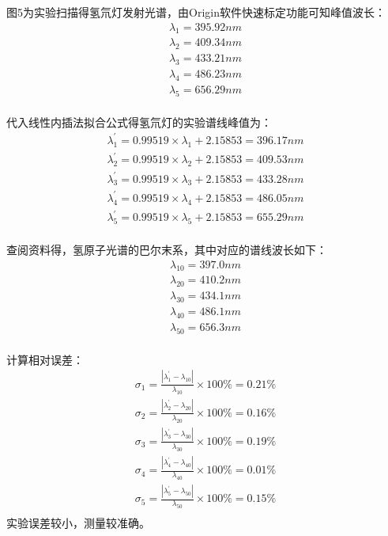 \documentclass[12pt,a4paper,UTF8]{ctexart}
\begin{document}
图5为实验扫描得氢氘灯发射光谱，由Origin软件快速标定功能可知峰值波长：
\begin{gather*}
	\lambda_1=395.92nm\\
	\lambda_2=409.34nm\\
	\lambda_3=433.21nm\\
	\lambda_4=486.23nm\\
	\lambda_5=656.29nm\\
\end{gather*}

代入线性内插法拟合公式得氢氘灯的实验谱线峰值为：
\begin{gather*}
	\lambda^{'}_1=0.99519\times\lambda_1+2.15853=396.17nm\\
	\lambda^{'}_2=0.99519\times\lambda_2+2.15853=409.53nm\\
	\lambda^{'}_3=0.99519\times\lambda_3+2.15853=433.28nm\\
	\lambda^{'}_4=0.99519\times\lambda_4+2.15853=486.05nm\\
	\lambda^{'}_5=0.99519\times\lambda_5+2.15853=655.29nm\\
\end{gather*}

查阅资料得，氢原子光谱的巴尔末系，其中对应的谱线波长如下：
\begin{gather*}
	\lambda_{10}=397.0nm\\
	\lambda_{20}=410.2nm\\
	\lambda_{30}=434.1nm\\
	\lambda_{40}=486.1nm\\
	\lambda_{50}=656.3nm\\
\end{gather*}

计算相对误差：
\begin{gather*}
	\sigma _1=\frac{|\lambda^{'}_1-\lambda_{10}|}{\lambda_{10}}\times100\%=0.21\%\\
	\sigma _2=\frac{|\lambda^{'}_2-\lambda_{20}|}{\lambda_{20}}\times100\%=0.16\%\\
	\sigma _3=\frac{|\lambda^{'}_3-\lambda_{30}|}{\lambda_{30}}\times100\%=0.19\%\\
	\sigma _4=\frac{|\lambda^{'}_4-\lambda_{40}|}{\lambda_{40}}\times100\%=0.01\%\\
	\sigma _5=\frac{|\lambda^{'}_5-\lambda_{50}|}{\lambda_{50}}\times100\%=0.15\%\\
\end{gather*}
实验误差较小，测量较准确。
\end{document}
